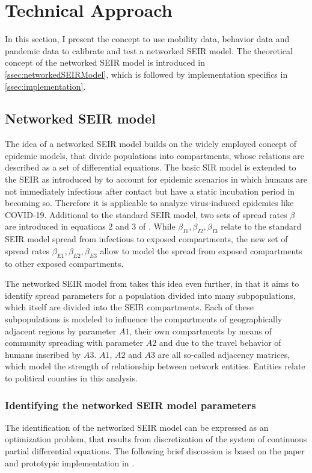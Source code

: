 \section{Technical Approach}
In this section, I present the concept to use mobility data, behavior data and pandemic data to calibrate and test a networked SEIR model. The theoretical concept of the networked SEIR model is introduced in \autoref{ssec:networkedSEIRModel}, which is followed by implementation specifics in \autoref{ssec:implementation}.

\subsection{Networked SEIR model}\label{ssec:networkedSEIRModel}

The idea of a networked SEIR model builds on the widely employed concept of epidemic models, that divide populations into compartments, whose relations are described as a set of differential equations. The basic SIR model is extended to the SEIR as introduced by \cite{aronSeasonalityPerioddoublingBifurcations1984} to account for epidemic scenarios in which humans are not immediately infectious after contact but have a static incubation period in becoming so. Therefore it is applicable to analyze virus-induced epidemics like COVID-19. Additional to the standard SEIR model, two sets of spread rates $\beta$ are introduced in equations 2 and 3 of \cite{vrabacCapturingEffectsTransportation2020}. While $\beta_{I1}, \beta_{I2}, \beta_{I3}$ relate to the standard SEIR model spread from infectious to exposed compartments, the new set of spread rates $\beta_{E1}, \beta_{E2}, \beta_{E3}$ allow to model the spread from exposed compartments to other exposed compartments.

The networked SEIR model from \cite{vrabacCapturingEffectsTransportation2020} takes this idea even further, in that it aims to identify spread parameters for a population divided into many subpopulations, which itself are divided into the SEIR compartments. Each of these subpopulations is modeled to influence the compartments of geographically adjacent regions by parameter $A1$, their own compartments by means of community spreading with parameter $A2$ and due to the travel behavior of humans inscribed by $A3$. $A1$, $A2$ and $A3$ are all so-called adjacency matrices, which model the strength of relationship between network entities. Entities relate to political counties in this analysis.

\subsubsection{Identifying the networked SEIR model parameters}\label{ssec:identifyNetworkedSEIR}
The identification of the networked SEIR model can be expressed as an optimization problem, that results from discretization of the system of continuous partial differential equations. The following brief discussion is based on the paper and prototypic implementation in \cite{vrabacCapturingEffectsTransportation2020}.

